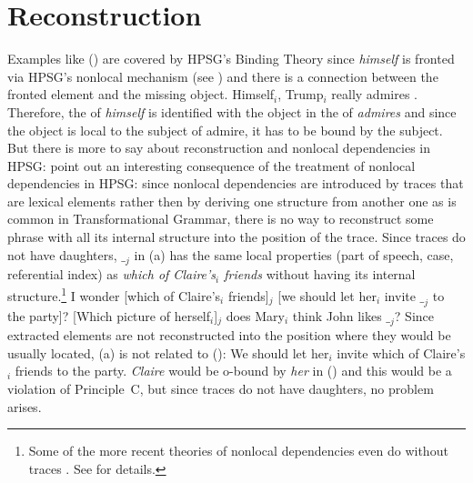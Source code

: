 \documentclass[output=paper
	        ,collection
	        ,collectionchapter
 	        ,biblatex
                ,babelshorthands
                ,newtxmath
                ,draftmode
                ,colorlinks, citecolor=brown
]{langscibook}
\begin{document}
\section{Reconstruction}


Examples like () are covered by HPSG's Binding Theory since \emph{himself} is fronted via
HPSG's nonlocal mechanism (see ) and there is a connection between the
fronted element and the missing object.
\eal
\ex Himself$_i$, Trump$_i$ really admires \trace.
\ex {}
\zl
Therefore, the \synsemv of \emph{himself} is identified with the object in the \argstl of
\emph{admires} and since the object is local to the subject of admire, it has to be bound by the
subject. But there is more to say about reconstruction and nonlocal dependencies in HPSG:
\citet[]{ps2} point out an interesting consequence of the treatment of nonlocal
dependencies in HPSG: since nonlocal dependencies are introduced by traces that are lexical elements
rather then by deriving one structure from another one as is common in Transformational Grammar,
there is no way to reconstruct some phrase with all its internal structure into the position of the
trace. Since traces do not have daughters, $\__j$ in (a) has the same local properties (part
of speech, case, referential index) as \emph{which of Claire's$_i$ friends} without having its internal structure.\footnote{
  Some of the more recent theories of nonlocal dependencies even do without traces \citep*{BMS2001a}. See
   for details.
}
\eal
\label{ex-which-of-clairs-friends}
\ex I wonder [which of Claire's$_i$ friends]$_j$ [we should let her$_i$ invite $\__j$ to the party]?
\ex {}[Which picture of herself$_i$]$_j$ does Mary$_i$ think John likes $\__j$?
\zl
Since extracted elements are not reconstructed into the position where they would be usually
located, (a) is not related to ():
\ea
We should let her$_i$ invite which of Claire's$_i$ friends to the party.
\z
\emph{Claire} would be o-bound by \emph{her} in () and this would be a violation of Principle~C, but since traces do not have daughters,
no problem arises.
\end{document}
